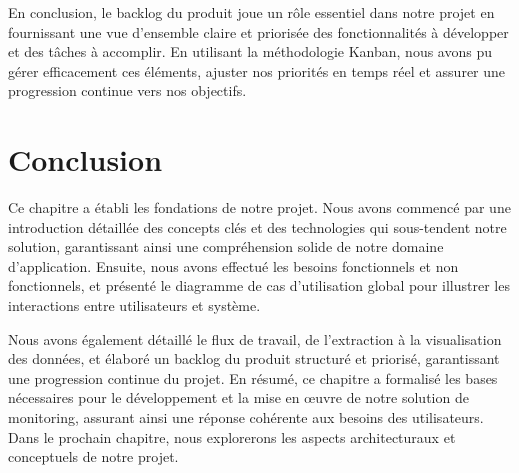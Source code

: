 \par En conclusion, le backlog du produit joue un rôle essentiel dans notre projet en fournissant une vue d'ensemble claire et priorisée des fonctionnalités à développer et des tâches à accomplir. 
En utilisant la méthodologie Kanban, nous avons pu gérer efficacement ces éléments, ajuster nos priorités en temps réel et assurer une progression continue vers nos objectifs.

\section*{Conclusion}
 \par Ce chapitre a établi les fondations de notre projet.  Nous avons commencé par une introduction détaillée des concepts clés et des technologies qui sous-tendent notre solution, garantissant ainsi une compréhension solide de notre domaine d'application. 
 Ensuite, nous avons effectué les besoins fonctionnels et non fonctionnels, et présenté le diagramme de cas d'utilisation global pour illustrer les interactions entre utilisateurs et système. 

\par Nous avons également détaillé le flux de travail, de l'extraction à la visualisation des données, et élaboré un backlog du produit structuré et priorisé, 
garantissant une progression continue du projet. 
En résumé, ce chapitre a formalisé les bases nécessaires pour le développement et la mise en œuvre de notre solution de monitoring, assurant ainsi une réponse cohérente aux besoins des utilisateurs.
 Dans le prochain chapitre, nous explorerons les aspects architecturaux et conceptuels de notre projet.

